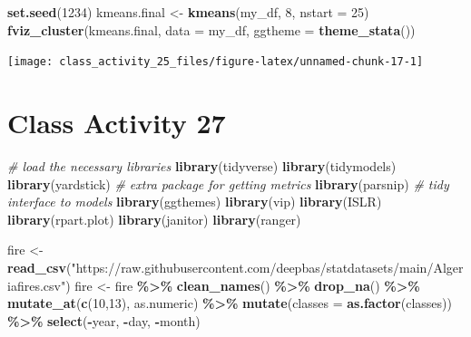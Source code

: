 \documentclass[
]{book}
\newenvironment{Shaded}{\begin{snugshade}}{\end{snugshade}}
\newcommand{\AttributeTok}[1]{\textcolor[rgb]{0.13,0.29,0.53}{#1}}
\newcommand{\CommentTok}[1]{\textcolor[rgb]{0.56,0.35,0.01}{\textit{#1}}}
\newcommand{\DecValTok}[1]{\textcolor[rgb]{0.00,0.00,0.81}{#1}}
\newcommand{\FunctionTok}[1]{\textcolor[rgb]{0.13,0.29,0.53}{\textbf{#1}}}
\newcommand{\NormalTok}[1]{#1}
\newcommand{\OtherTok}[1]{\textcolor[rgb]{0.56,0.35,0.01}{#1}}
\newcommand{\SpecialCharTok}[1]{\textcolor[rgb]{0.81,0.36,0.00}{\textbf{#1}}}
\newcommand{\StringTok}[1]{\textcolor[rgb]{0.31,0.60,0.02}{#1}}
\begin{document}
\begin{Shaded}
\begin{Highlighting}[]
\FunctionTok{set.seed}\NormalTok{(}\DecValTok{1234}\NormalTok{)}
\NormalTok{kmeans.final }\OtherTok{\textless{}{-}} \FunctionTok{kmeans}\NormalTok{(my\_df, }\DecValTok{8}\NormalTok{, }\AttributeTok{nstart =} \DecValTok{25}\NormalTok{)}
\FunctionTok{fviz\_cluster}\NormalTok{(kmeans.final, }\AttributeTok{data =}\NormalTok{ my\_df, }\AttributeTok{ggtheme =} \FunctionTok{theme\_stata}\NormalTok{())}
\end{Highlighting}
\end{Shaded}

\texttt{[image: class\_activity\_25\_files/figure-latex/unnamed-chunk-17-1]}

\hypertarget{class-activity-27}{%
\chapter{Class Activity 27}\label{class-activity-27}}

\begin{Shaded}
\begin{Highlighting}[]
\CommentTok{\# load the necessary libraries}
\FunctionTok{library}\NormalTok{(tidyverse) }
\FunctionTok{library}\NormalTok{(tidymodels)}
\FunctionTok{library}\NormalTok{(yardstick) }\CommentTok{\# extra package for getting metrics}
\FunctionTok{library}\NormalTok{(parsnip) }\CommentTok{\# tidy interface to models}
\FunctionTok{library}\NormalTok{(ggthemes)}
\FunctionTok{library}\NormalTok{(vip)}
\FunctionTok{library}\NormalTok{(ISLR)}
\FunctionTok{library}\NormalTok{(rpart.plot)}
\FunctionTok{library}\NormalTok{(janitor)}
\FunctionTok{library}\NormalTok{(ranger)}


\NormalTok{fire }\OtherTok{\textless{}{-}} \FunctionTok{read\_csv}\NormalTok{(}\StringTok{"https://raw.githubusercontent.com/deepbas/statdatasets/main/Algeriafires.csv"}\NormalTok{)}
\NormalTok{fire }\OtherTok{\textless{}{-}}\NormalTok{ fire }\SpecialCharTok{\%\textgreater{}\%} \FunctionTok{clean\_names}\NormalTok{() }\SpecialCharTok{\%\textgreater{}\%} 
  \FunctionTok{drop\_na}\NormalTok{() }\SpecialCharTok{\%\textgreater{}\%} 
  \FunctionTok{mutate\_at}\NormalTok{(}\FunctionTok{c}\NormalTok{(}\DecValTok{10}\NormalTok{,}\DecValTok{13}\NormalTok{), as.numeric) }\SpecialCharTok{\%\textgreater{}\%}
  \FunctionTok{mutate}\NormalTok{(}\AttributeTok{classes =} \FunctionTok{as.factor}\NormalTok{(classes)) }\SpecialCharTok{\%\textgreater{}\%}
  \FunctionTok{select}\NormalTok{(}\SpecialCharTok{{-}}\NormalTok{year, }\SpecialCharTok{{-}}\NormalTok{day, }\SpecialCharTok{{-}}\NormalTok{month)}
\end{Highlighting}
\end{Shaded}
\end{document}

